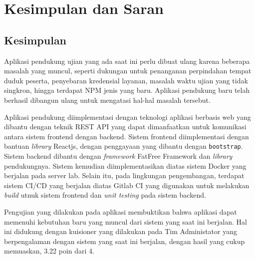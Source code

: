 \chapter{Kesimpulan dan Saran}
\label{chap:kesimpulan-saran}

\section{Kesimpulan}
    Aplikasi pendukung ujian yang ada saat ini perlu dibuat ulang karena  beberapa masalah yang muncul, seperti
    dukungan untuk penanganan perpindahan tempat duduk peserta, penyebaran kredensial layanan, masalah waktu ujian
    yang tidak singkron, hingga terdapat NPM jenis yang baru. Aplikasi pendukung baru telah berhasil dibangun
    ulang untuk mengatasi hal-hal masalah tersebut.
    
    Aplikasi pendukung diimplementasi dengan teknologi aplikasi berbasis web yang dibantu dengan teknik REST API
    yang dapat dimanfaatkan untuk komunikasi antara sistem frontend dengan backend. Sistem frontend diimplementasi
    dengan bantuan \textit{library} Reactjs, dengan penggayaan yang dibantu dengan \texttt{bootstrap}. Sistem
    backend dibantu dengan \textit{framework} FatFree Framework dan \textit{library} pendukungnya. Sistem
    kemudian diimplementasikan diatas sistem Docker yang berjalan pada server lab. Selain itu, pada lingkungan
    pengembangan, terdapat sistem CI/CD yang berjalan diatas Gitlab CI yang digunakan untuk melakukan
    \textit{build} utnuk sistem frontend dan \textit{unit testing} pada sistem backend.
    
    Pengujian yang dilakukan pada aplikasi membuktikan  bahwa aplikasi dapat memenuhi kebutuhan baru yang muncul
    dari sistem yang saat ini berjalan. Hal ini didukung dengan kuisioner yang dilakukan pada Tim Administator
    yang berpengalaman dengan sistem yang saat ini berjalan, dengan hasil yang cukup memuaskan, 3.22 poin dari 4.
    
